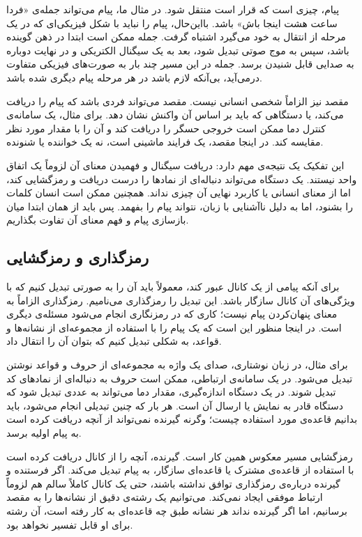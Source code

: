 پیام، چیزی است که قرار است منتقل شود. در مثال ما، پیام می‌تواند جمله‌ی «فردا ساعت هشت اینجا باش» باشد. بااین‌حال، پیام را نباید با شکل فیزیکی‌ای که در یک مرحله از انتقال به خود می‌گیرد اشتباه گرفت. جمله ممکن است ابتدا در ذهن گوینده باشد، سپس به موج صوتی تبدیل شود، بعد به یک سیگنال الکتریکی و در نهایت دوباره به صدایی قابل شنیدن برسد. جمله در این مسیر چند بار به صورت‌های فیزیکی متفاوت درمی‌آید، بی‌آنکه لازم باشد در هر مرحله پیام دیگری شده باشد.

مقصد نیز الزاماً شخصی انسانی نیست. مقصد می‌تواند فردی باشد که پیام را دریافت می‌کند، یا دستگاهی که باید بر اساس آن واکنش نشان دهد. برای مثال، یک سامانه‌ی کنترل دما ممکن است خروجی حسگر را دریافت کند و آن را با مقدار مورد نظر مقایسه کند. در اینجا مقصد، یک فرایند ماشینی است، نه یک خواننده یا شنونده.

این تفکیک یک نتیجه‌ی مهم دارد: دریافت سیگنال و فهمیدن معنای آن لزوماً یک اتفاق واحد نیستند. یک دستگاه می‌تواند دنباله‌ای از نمادها را درست دریافت و رمزگشایی کند، اما از معنای انسانی یا کاربرد نهایی آن چیزی نداند. همچنین ممکن است انسان کلمات را بشنود، اما به دلیل ناآشنایی با زبان، نتواند پیام را بفهمد. پس باید از همان ابتدا میان بازسازی پیام و فهم معنای آن تفاوت بگذاریم.

\subsection{رمزگذاری و رمزگشایی}
\label{sub:encoding-decoding}

برای آنکه پیامی از یک کانال عبور کند، معمولاً باید آن را به صورتی تبدیل کنیم که با ویژگی‌های آن کانال سازگار باشد. این تبدیل را رمزگذاری می‌نامیم. رمزگذاری الزاماً به معنای پنهان‌کردن پیام نیست؛ کاری که در رمزنگاری انجام می‌شود مسئله‌ی دیگری است. در اینجا منظور این است که یک پیام را با استفاده از مجموعه‌ای از نشانه‌ها و قواعد، به شکلی تبدیل کنیم که بتوان آن را انتقال داد.

برای مثال، در زبان نوشتاری، صدای یک واژه به مجموعه‌ای از حروف و قواعد نوشتن تبدیل می‌شود. در یک سامانه‌ی ارتباطی، ممکن است حروف به دنباله‌ای از نمادهای کد تبدیل شوند. در یک دستگاه اندازه‌گیری، مقدار دما می‌تواند به عددی تبدیل شود که دستگاه قادر به نمایش یا ارسال آن است. هر بار که چنین تبدیلی انجام می‌شود، باید بدانیم قاعده‌ی مورد استفاده چیست؛ وگرنه گیرنده نمی‌تواند از آنچه دریافت کرده است به پیام اولیه برسد.

رمزگشایی مسیر معکوس همین کار است. گیرنده، آنچه را از کانال دریافت کرده است با استفاده از قاعده‌ی مشترک یا قاعده‌ای سازگار، به پیام تبدیل می‌کند. اگر فرستنده و گیرنده درباره‌ی رمزگذاری توافق نداشته باشند، حتی یک کانال کاملاً سالم هم لزوماً ارتباط موفقی ایجاد نمی‌کند. می‌توانیم یک رشته‌ی دقیق از نشانه‌ها را به مقصد برسانیم، اما اگر گیرنده نداند هر نشانه طبق چه قاعده‌ای به کار رفته است، آن رشته برای او قابل تفسیر نخواهد بود.

